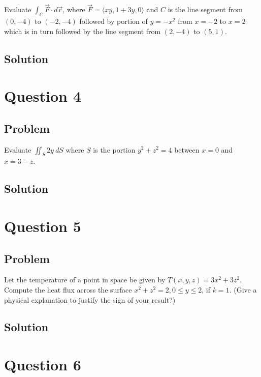 \documentclass[12pt]{article}
\begin{document}
Evaluate \(\int_C \vec{F} \cdot d \vec{r}\), where \(\vec{F} = \langle xy, 1 + 3y, 0\rangle \) and
\(C\) is the line segment from \((0, -4)\) to \((-2, -4)\) followed by portion of \(y = -x^2\)
from \(x = -2\) to \(x = 2\) which is in turn followed by the line segment from \((2, -4)\)
to \((5, 1)\).

\subsection{Solution}



\newpage
\section{Question 4}

\subsection{Problem}

Evaluate \(\iint_S 2y\ dS\) where \(S\) is the portion \(y^2 + z^2 = 4\) between \(x = 0\)
and \(x = 3 - z\).

\subsection{Solution}



\newpage
\section{Question 5}

\subsection{Problem}

Let the temperature of a point in space be given by \(T(x, y, z)= 3x^2 + 3z^2\).
Compute the heat flux across the surface \(x^2 + z^2 = 2, 0 \leq y \leq 2\), if \(k = 1\).
(Give a physical explanation to justify the sign of your result?)

\subsection{Solution}



\newpage
\section{Question 6}
\end{document}
